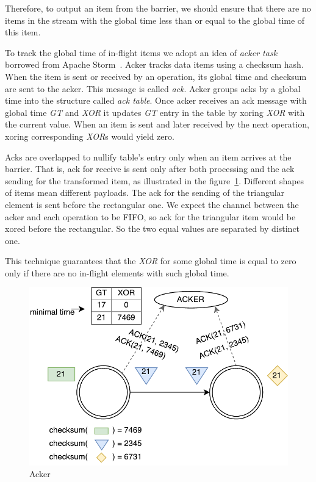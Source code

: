 Therefore, to output an item from the barrier, we should ensure that there are no items in the stream with the global time less than or equal to the global time of this item.

To track the global time of in-flight items we adopt an idea of {\it acker task} borrowed from Apache Storm~\cite{apache:storm}. Acker tracks data items using a checksum hash. When the item is sent or received by an operation, its global time and checksum are sent to the acker. This message is called {\it ack}. Acker groups acks by a global time into the structure called {\it ack table}. Once acker receives an ack message with global time {\it GT} and {\it XOR} it updates {\it GT} entry in the table by xoring {\it XOR} with the current value. When an item is sent and later received by the next operation, xoring corresponding {\it XOR}s would yield zero.

Acks are overlapped to nullify table's entry only when an item arrives at the barrier. That is, ack for receive is sent only after both processing and the ack sending for the transformed item, as illustrated in the figure~\ref{acker}. Different shapes of items mean different payloads. The ack for the sending of the triangular element is sent before the rectangular one. We expect the channel between the acker and each operation to be FIFO, so ack for the triangular item would be xored before the rectangular. So the two equal values are separated by distinct one. 

This technique guarantees that the {\it XOR} for some global time is equal to zero only if there are no in-flight elements with such global time.

\begin{figure}[htbp]
  \centering
  \includegraphics[scale=0.5]{pics/acker}
  \caption{Acker}
  \label {acker}
\end{figure}

